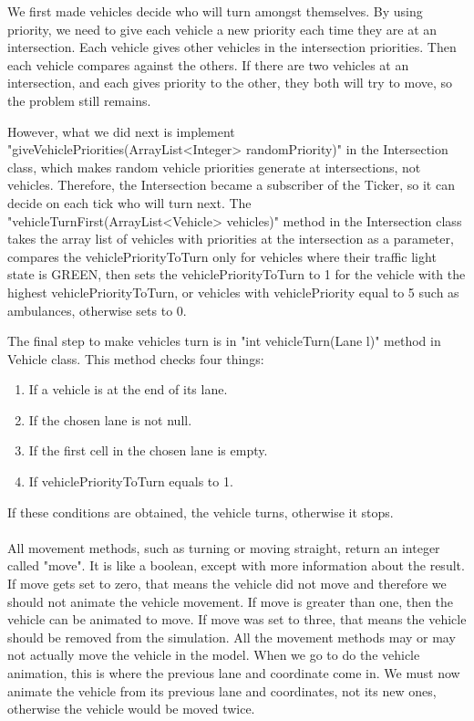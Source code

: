 \documentclass[a4paper,11pt,titlepage]{article}
\begin{document}
We first made vehicles decide who will turn amongst themselves. 
By using priority, we need to give each vehicle a new priority each time they are at an intersection. Each vehicle gives other vehicles in the intersection priorities. Then each vehicle compares against the others. If there are two vehicles at an intersection, and each gives priority to the other, they both will try to move, so the problem still remains.

However, what we did next is implement "giveVehiclePriorities(ArrayList<Integer> randomPriority)" in the Intersection class, which makes random vehicle priorities generate at intersections, not vehicles. Therefore, the Intersection became a subscriber of the Ticker, so it can decide on each tick who will turn next.
The "vehicleTurnFirst(ArrayList<Vehicle> vehicles)" method in the Intersection class takes the array list of vehicles with priorities at the intersection as a parameter, compares the vehiclePriorityToTurn only for vehicles where their traffic light state is GREEN, then sets the vehiclePriorityToTurn to 1 for the  vehicle with the highest vehiclePriorityToTurn, or vehicles with vehiclePriority equal to 5 such as ambulances, otherwise sets to 0.

The final step to make vehicles turn is in "int vehicleTurn(Lane l)" method in Vehicle class. This method checks four things:
\begin{enumerate}\itemsep1pt \parskip0pt 
\item If a vehicle is at the end of its lane.
\item If the chosen lane is not null.
\item If the first cell in the chosen lane is empty.
\item If vehiclePriorityToTurn equals to 1.
\end{enumerate}
If these conditions are obtained, the vehicle turns, otherwise it stops.

\paragraph{}
All movement methods, such as turning or moving straight, return an integer called "move". It is like a boolean, except with more information about the result. If move gets set to zero, that means the vehicle did not move and therefore we should not animate the vehicle movement. If move is greater than one, then the vehicle can be animated to move. If move was set to three, that means the vehicle should be removed from the simulation. All the movement methods may or may not actually move the vehicle in the model. When we go to do the vehicle animation, this is where the previous lane and coordinate come in. We must now animate the vehicle from its previous lane and coordinates, not its new ones, otherwise the vehicle would be moved twice. 
\end{document}
